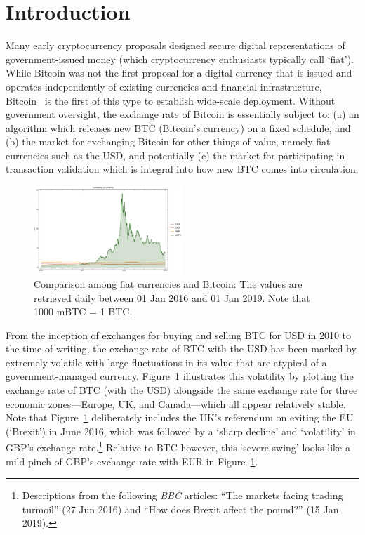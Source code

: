 
\section{Introduction}\label{sec:Intro}

Many early cryptocurrency proposals designed secure digital representations of government-issued money (which cryptocurrency enthusiasts typically call `fiat'). While Bitcoin was not the first proposal for a digital currency that is issued and operates independently of existing currencies and financial infrastructure, Bitcoin~\cite{nakamoto2008bitcoin} is the first of this type to establish wide-scale deployment. Without government oversight, the exchange rate of Bitcoin is essentially subject to: (a) an algorithm which releases new BTC (Bitcoin's currency) on a fixed schedule, and (b) the market for exchanging Bitcoin for other things of value, namely fiat currencies such as the USD, and potentially (c) the market for participating in transaction validation which is integral into how new BTC comes into circulation.

\begin{figure}[t]
	\centering
	\includegraphics[width=0.5\textwidth]{figures/allCurrencies.pdf}
	\caption{\label{fig:btcandfiat}Comparison among fiat currencies and Bitcoin: The values are retrieved daily between  01 Jan 2016 and 01 Jan 2019. Note that 1000 mBTC = 1 BTC.}
\end{figure}

From the inception of exchanges for buying and selling BTC for USD in 2010 to the time of writing, the exchange rate of BTC with the USD has been marked by extremely volatile with large fluctuations in its value that are atypical of a government-managed currency. Figure~\ref{fig:btcandfiat} illustrates this volatility by plotting the exchange rate of BTC (with the USD) alongside the same exchange rate for three economic zones---Europe, UK, and Canada---which all appear relatively stable. Note that Figure~\ref{fig:btcandfiat} deliberately includes the UK's referendum on exiting the EU (`Brexit') in June 2016, which was followed by a `sharp decline' and `volatility' in GBP's exchange rate.\footnote{Descriptions from the following \textit{BBC} articles: ``The markets facing trading turmoil'' (27 Jun 2016) and ``How does Brexit affect the pound?'' (15 Jan 2019).}  Relative to BTC however, this `severe swing' looks like a mild pinch of GBP's exchange rate with EUR in Figure~\ref{fig:btcandfiat}.

